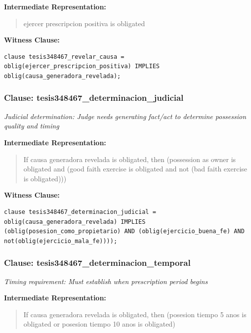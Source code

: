 \documentclass[11pt,a4paper]{article}
\begin{document}
\textbf{Intermediate Representation:}

\begin{quote}
ejercer prescripcion positiva is obligated
\end{quote}

\textbf{Witness Clause:}

\begin{lstlisting}[style=witnessstyle, language=Witness]
clause tesis348467_revelar_causa = oblig(ejercer_prescripcion_positiva) IMPLIES oblig(causa_generadora_revelada);
\end{lstlisting}

\subsubsection{Clause: tesis348467\_determinacion\_judicial}

\textit{Judicial determination: Judge needs generating fact/act to determine possession quality and timing}

\textbf{Intermediate Representation:}

\begin{quote}
If causa generadora revelada is obligated, then (possession as owner is obligated and (good faith exercise is obligated and not (bad faith exercise is obligated)))
\end{quote}

\textbf{Witness Clause:}

\begin{lstlisting}[style=witnessstyle, language=Witness]
clause tesis348467_determinacion_judicial = oblig(causa_generadora_revelada) IMPLIES (oblig(posesion_como_propietario) AND (oblig(ejercicio_buena_fe) AND not(oblig(ejercicio_mala_fe))));
\end{lstlisting}

\subsubsection{Clause: tesis348467\_determinacion\_temporal}

\textit{Timing requirement: Must establish when prescription period begins}

\textbf{Intermediate Representation:}

\begin{quote}
If causa generadora revelada is obligated, then (posesion tiempo 5 anos is obligated or posesion tiempo 10 anos is obligated)
\end{quote}
\end{document}
